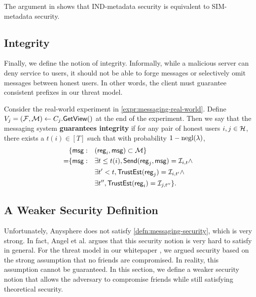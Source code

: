 The argument in \cite[Appendix A]{shi2021non} shows that IND-metadata security is equivalent to SIM-metadata security.

\subsection{Integrity}

Finally, we define the notion of integrity. Informally, while a malicious server can deny service to users, it should not be able to forge messages or selectively omit messages between honest users. In other words, the client must guarantee consistent prefixes in our threat model.
\begin{definition}
\label{defn:messaging-integrity}
Consider the real-world experiment in \cref{expr:messaging-real-world}. Define $V_j = (\mathcal{F}, \mathcal{M}) \leftarrow C_j.\mathsf{GetView}()$ at the end of the experiment. Then we say that the messaging system \textbf{guarantees integrity} if for any pair of honest users $i, j \in \mathcal{H}$, there exists a $t(i) \in [T]$ such that with probability $1 - \operatorname{negl}(\lambda)$,
\begin{align*}
     &\{\mathsf{msg}: &&(\mathsf{reg}_i, \mathsf{msg}) \subset \mathcal{M}\} \\
      =& \{\mathsf{msg}: &&\exists t \leq t(i), \mathsf{Send}(\mathsf{reg}_j, \mathsf{msg}) = \mathcal{I}_{i, t} \land \\
          &   &&\exists t' < t, \mathsf{TrustEst}(\mathsf{reg}_j) = \mathcal{I}_{i, t'} \land \\
          &   &&\exists t'', \mathsf{TrustEst}(\mathsf{reg}_i) = \mathcal{I}_{j, t''}\}.
\end{align*}
\end{definition}

\subsection{A Weaker Security Definition}
\label{subsec:messaging-security-weaker}
Unfortunately, Anysphere does not satisfy \cref{defn:messaging-security}, which is very strong. In fact, Angel et al. \cite{angel2018cf} argues that this security notion is very hard to satisfy in general. For the threat model in our whitepaper \cite{whitepaper}, we argued security based on the strong assumption that no friends are compromised. In reality, this assumption cannot be guaranteed. In this section, we define a weaker security notion that allows the adversary to compromise friends while still satisfying theoretical security.



